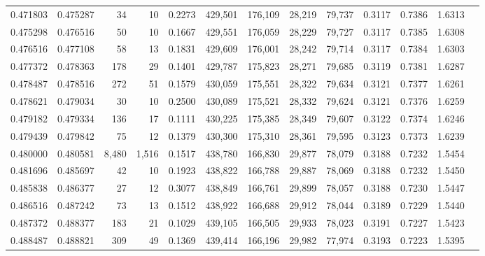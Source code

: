 \begin{tabular}{rrrrrrrrrrrrr}
0.471803 & 0.475287 &     34 &    10 &                                     0.2273 & 429,501 & 176,109 &  28,219 &  79,737 & 0.3117 & 0.7386 & 1.6313 \\
0.475298 & 0.476516 &     50 &    10 &                                     0.1667 & 429,551 & 176,059 &  28,229 &  79,727 & 0.3117 & 0.7385 & 1.6308 \\
0.476516 & 0.477108 &     58 &    13 &                                     0.1831 & 429,609 & 176,001 &  28,242 &  79,714 & 0.3117 & 0.7384 & 1.6303 \\
0.477372 & 0.478363 &    178 &    29 &                                     0.1401 & 429,787 & 175,823 &  28,271 &  79,685 & 0.3119 & 0.7381 & 1.6287 \\
0.478487 & 0.478516 &    272 &    51 &                                     0.1579 & 430,059 & 175,551 &  28,322 &  79,634 & 0.3121 & 0.7377 & 1.6261 \\
0.478621 & 0.479034 &     30 &    10 &                                     0.2500 & 430,089 & 175,521 &  28,332 &  79,624 & 0.3121 & 0.7376 & 1.6259 \\
0.479182 & 0.479334 &    136 &    17 &                                     0.1111 & 430,225 & 175,385 &  28,349 &  79,607 & 0.3122 & 0.7374 & 1.6246 \\
0.479439 & 0.479842 &     75 &    12 &                                     0.1379 & 430,300 & 175,310 &  28,361 &  79,595 & 0.3123 & 0.7373 & 1.6239 \\
0.480000 & 0.480581 &  8,480 & 1,516 &                                     0.1517 & 438,780 & 166,830 &  29,877 &  78,079 & 0.3188 & 0.7232 & 1.5454 \\
0.481696 & 0.485697 &     42 &    10 &                                     0.1923 & 438,822 & 166,788 &  29,887 &  78,069 & 0.3188 & 0.7232 & 1.5450 \\
0.485838 & 0.486377 &     27 &    12 &                                     0.3077 & 438,849 & 166,761 &  29,899 &  78,057 & 0.3188 & 0.7230 & 1.5447 \\
0.486516 & 0.487242 &     73 &    13 &                                     0.1512 & 438,922 & 166,688 &  29,912 &  78,044 & 0.3189 & 0.7229 & 1.5440 \\
0.487372 & 0.488377 &    183 &    21 &                                     0.1029 & 439,105 & 166,505 &  29,933 &  78,023 & 0.3191 & 0.7227 & 1.5423 \\
0.488487 & 0.488821 &    309 &    49 &                                     0.1369 & 439,414 & 166,196 &  29,982 &  77,974 & 0.3193 & 0.7223 & 1.5395 \\

\end{tabular}
